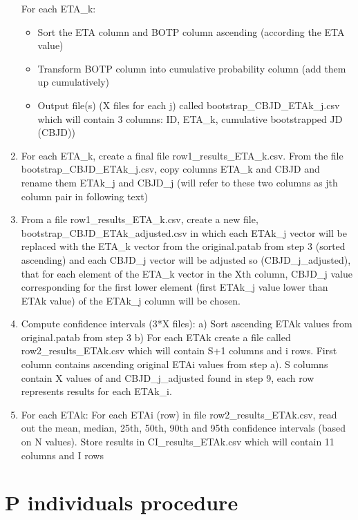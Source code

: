 \begin{enumerate}
	For each ETA\_k:
\begin{itemize}
	\item Sort the ETA column and BOTP column ascending (according the ETA value) 
	\item Transform BOTP column into cumulative probability column (add them up cumulatively)
	\item Output file(s) (X files for each j) called bootstrap\_CBJD\_ETAk\_j.csv which will contain 3 	columns: ID, ETA\_k, cumulative bootstrapped JD (CBJD))
\end{itemize}
\item For each ETA\_k, create a final file row1\_results\_ETA\_k.csv. From the file bootstrap\_CBJD\_ETAk\_j.csv, copy columns ETA\_k and CBJD and rename them ETAk\_j and CBJD\_j (will refer to these two columns as jth column pair in following text)
\item From a file row1\_results\_ETA\_k.csv, create a new file, bootstrap\_CBJD\_ETAk\_adjusted.csv in which each ETAk\_j vector will be replaced with the ETA\_k vector from the original.patab from step 3 (sorted ascending) and each CBJD\_j vector will be adjusted so (CBJD\_j\_adjusted), that for each element of the ETA\_k vector in the Xth column, CBJD\_j value corresponding for the first lower element (first ETAk\_j value lower than ETAk value) of the ETAk\_j column will be chosen. 
\item Compute confidence intervals (3*X files): a) Sort ascending ETAk values from original.patab from step 3 b) For each ETAk create a file called row2\_results\_ETAk.csv which will contain S+1 columns and i rows. First column contains ascending original ETAi values from step a). S columns contain X values of and CBJD\_j\_adjusted found in step 9, each row represents results for each ETAk\_i.
\item For each ETAk: For each ETAi (row) in file row2\_results\_ETAk.csv, read out the mean, median, 25th, 50th, 90th and 95th confidence intervals (based on N values). Store results in CI\_results\_ETAk.csv which will contain 11 columns and I rows
\end{enumerate}

\section{P individuals procedure}

